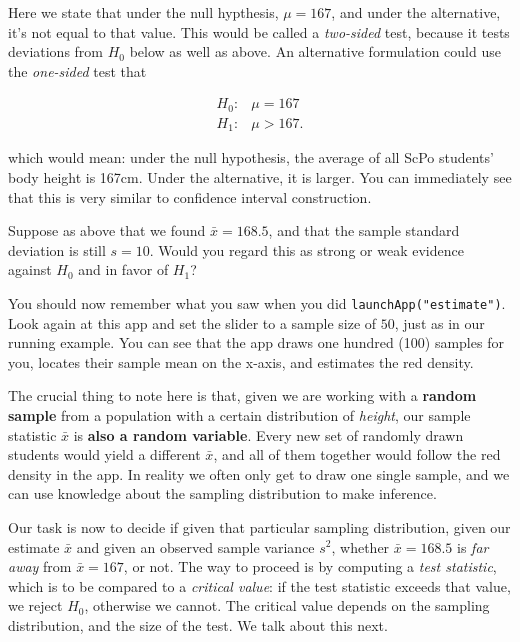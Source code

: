 \documentclass[]{book}
\newenvironment{note}{\begin{tcolorbox}[colback=blue!5!white,colframe=blue!75!black]}{\end{tcolorbox}}
\begin{document}
Here we state that under the null hypthesis, \(\mu = 167\), and under
the alternative, it's not equal to that value. This would be called a
\emph{two-sided} test, because it tests deviations from \(H_0\) below as
well as above. An alternative formulation could use the \emph{one-sided}
test that

\begin{align}
H_0:& \mu = 167\\
H_1:& \mu > 167.
\end{align}

which would mean: under the null hypothesis, the average of all ScPo
students' body height is 167cm. Under the alternative, it is larger. You
can immediately see that this is very similar to confidence interval
construction.

Suppose as above that we found \(\bar{x} = 168.5\), and that the sample
standard deviation is still \(s=10\). Would you regard this as strong or
weak evidence against \(H_0\) and in favor of \(H_1\)?

You should now remember what you saw when you did
\texttt{launchApp("estimate")}. Look again at this app and set the
slider to a sample size of \(50\), just as in our running example. You
can see that the app draws one hundred (100) samples for you, locates
their sample mean on the x-axis, and estimates the red density.

\begin{note}
The crucial thing to note here is that, given we are working with a
\textbf{random sample} from a population with a certain distribution of
\emph{height}, our sample statistic \(\bar{x}\) is \textbf{also a random
variable}. Every new set of randomly drawn students would yield a
different \(\bar{x}\), and all of them together would follow the red
density in the app. In reality we often only get to draw one single
sample, and we can use knowledge about the sampling distribution to make
inference.
\end{note}

Our task is now to decide if given that particular sampling
distribution, given our estimate \(\bar{x}\) and given an observed
sample variance \(s^2\), whether \(\bar{x} = 168.5\) is \emph{far away}
from \(\bar{x} = 167\), or not. The way to proceed is by computing a
\emph{test statistic}, which is to be compared to a \emph{critical
value}: if the test statistic exceeds that value, we reject \(H_0\),
otherwise we cannot. The critical value depends on the sampling
distribution, and the size of the test. We talk about this next.
\end{document}
